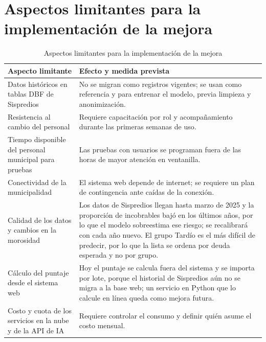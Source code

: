 \documentclass[12pt,a4paper]{report}
\newcommand{\nota}[1]{\par\vspace{1pt}{\singlespacing\footnotesize\raggedright\textit{Nota.} #1\par}}
\begin{document}
\section{Aspectos limitantes para la implementación de la mejora}

\begin{table}[H]
\centering
\caption{Aspectos limitantes para la implementación de la mejora}
\label{tab:limitantes}
\singlespacing\small
\begin{tabular}{@{}L{5.6cm}L{8.8cm}@{}}
\toprule
\textbf{Aspecto limitante} & \textbf{Efecto y medida prevista} \\
\midrule
Datos históricos en tablas DBF de Sispredios & No se migran como registros vigentes; se usan como referencia y para entrenar el modelo, previa limpieza y anonimización. \\
Resistencia al cambio del personal & Requiere capacitación por rol y acompañamiento durante las primeras semanas de uso. \\
Tiempo disponible del personal municipal para pruebas & Las pruebas con usuarios se programan fuera de las horas de mayor atención en ventanilla. \\
Conectividad de la municipalidad & El sistema web depende de internet; se requiere un plan de contingencia ante caídas de la conexión. \\
Calidad de los datos y cambios en la morosidad & Los datos de Sispredios llegan hasta marzo de 2025 y la proporción de incobrables bajó en los últimos años, por lo que el modelo sobreestima ese riesgo; se recalibrará con cada año nuevo. El grupo Tardío es el más difícil de predecir, por lo que la lista se ordena por deuda esperada y no por grupo. \\
Cálculo del puntaje desde el sistema web & Hoy el puntaje se calcula fuera del sistema y se importa por lote, porque el historial de Sispredios aún no se migra a la base web; un servicio en Python que lo calcule en línea queda como mejora futura. \\
Costo y cuota de los servicios en la nube y de la API de IA & Requiere controlar el consumo y definir quién asume el costo mensual. \\
\bottomrule
\end{tabular}
\nota{Elaboración propia.}
\end{table}

\end{document}
